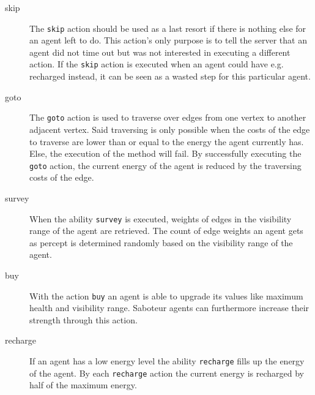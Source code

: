 \begin{description}
   \item[skip] The \texttt{skip} action should be used as a last resort if there is nothing else for an agent left to do.
               This action's only purpose is to tell the server that an agent did not time out but was not interested in executing a different action.
               If the \texttt{skip} action is executed when an agent could have e.g. recharged instead, it can be seen as a wasted step for this particular agent.
   \item[goto] The \texttt{goto} action is used to traverse over edges from one vertex to another adjacent vertex.
               Said traversing is only possible when the costs of the edge to traverse are lower than or equal to the energy the agent currently has.
               Else, the execution of the method will fail.
               By successfully executing the \texttt{goto} action, the current energy of the agent is reduced by the traversing costs of the edge.
   \item[survey] When the ability \texttt{survey} is executed, weights of edges in the visibility range of the agent are retrieved.
                 The count of edge weights an agent gets as percept is determined randomly based on the visibility range of the agent.
   \item[buy] With the action \texttt{buy} an agent is able to upgrade its values like maximum health and visibility range.
              Saboteur agents can furthermore increase their strength through this action.
   \item[recharge] If an agent has a low energy level the ability \texttt{recharge} fills up the energy of the agent.
                   By each \texttt{recharge} action the current energy is recharged by half of the maximum energy.
\end{description}
